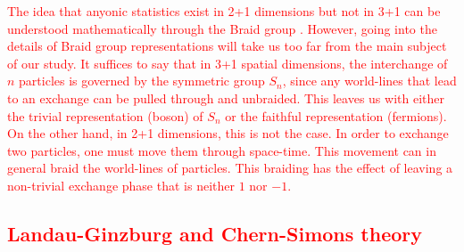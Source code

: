  \textcolor{red}{The idea that anyonic statistics exist in 2+1 dimensions but not in 3+1 can be understood mathematically through the Braid group \cite{PhysRevLett.52.2103, Artin1947}. However, going into the details of Braid group representations will take us too far from the main subject of our study. It suffices to say that in 3+1 spatial dimensions, the interchange of $n$ particles is governed by the symmetric group $S_n$, since any world-lines that lead to an exchange can be pulled through and unbraided. This leaves us with either the trivial representation (boson) of $S_n$ or the faithful representation (fermions). On the other hand, in 2+1 dimensions, this is not the case. In order to exchange two particles, one must move them through space-time. This movement can in general braid the world-lines of particles. This braiding has the effect of leaving a non-trivial exchange phase that is neither $1$ nor $-1$.}


\textcolor{red}{\subsection{Landau-Ginzburg and Chern-Simons theory}}


